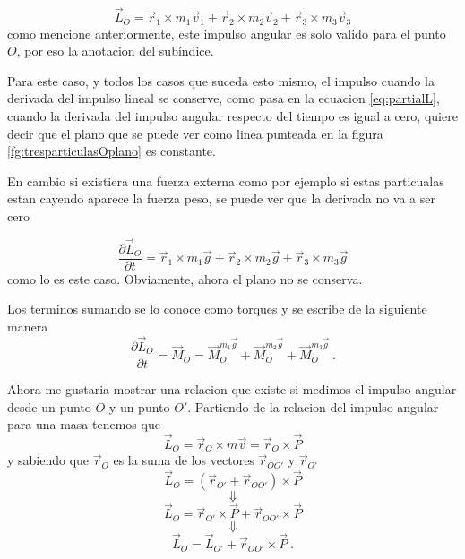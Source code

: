 \documentclass[../Main.tex]{subfiles}
\begin{document}
{        \begin{equation}
            \vec{L}_O = \vec{r}_1 \times m_1 \vec{v} _1 + \vec{r}_2 \times m_2 \vec{v} _2 + \vec{r}_3 \times m_3 \vec{v} _3
        \end{equation}
        como mencione anteriormente, este impulso angular es solo valido para el punto
        $O$, por eso la anotacion del subíndice.

}

\npage{
}
{
    Para este caso, y todos los casos que suceda esto mismo, el impulso
    cuando la derivada del impulso lineal se conserve, como pasa en la
    ecuacion \ref{eq:partialL}, cuando la derivada del impulso angular
    respecto del tiempo es igual a cero, quiere decir que el plano que
    se puede ver como linea punteada en la figura \ref{fg:tresparticulasOplano}
    es constante.

    En cambio si existiera una fuerza externa como por ejemplo si estas
    particualas estan cayendo aparece la fuerza peso, se puede ver que
    la derivada no va a ser cero

    \begin{equation*}
        \frac{\partial \vec{L} _O}{\partial t} = \vec{r}_1 \times m_1 \vec{g} + \vec{r}_2 \times m_2 \vec{g} + \vec{r}_3 \times m_3 \vec{g}
    \end{equation*}
    como lo es este caso. Obviamente, ahora el plano no se conserva.

    Los terminos sumando se lo conoce como torques y se escribe de la 
    siguiente manera
    \begin{equation*}
        \frac{\partial \vec{L} _O}{\partial t} = \vec{M} _O = \vec{M} _O ^{m_1 \vec{g}} + \vec{M} _O ^{m_2 \vec{g}} + \vec{M} _O ^{m_3 \vec{g}} \ .
    \end{equation*}

    Ahora me gustaria mostrar una relacion que existe si medimos el 
    impulso angular desde un punto $O$ y un punto $O'$. Partiendo de la
    relacion del impulso angular para una masa tenemos que
    \begin{equation*}
        \vec{L}_O = \vec{r} _O \times m \vec{v} = \vec{r}_O \times \vec{P}
    \end{equation*}
    y sabiendo que $\vec{r} _O$ es la suma de los vectores $\vec{r} _{OO'}$
    y $\vec{r} _{O'}$
    \begin{equation*}
        \vec{L}_O = \left( \vec{r} _{O'} + \vec{r} _{OO'} \right) \times \vec{P}
    \end{equation*}
    \begin{equation*}
        \Downarrow
    \end{equation*}
    \begin{equation*}
        \vec{L}_O = \vec{r} _{O'} \times \vec{P} + \vec{r} _{OO'} \times \vec{P}
    \end{equation*}
    \begin{equation*}
        \Downarrow
    \end{equation*}
    \begin{equation*}
        \vec{L}_O = \vec{L}_{O'} + \vec{r} _{OO'} \times \vec{P} \ .
    \end{equation*}

}
\end{document}

